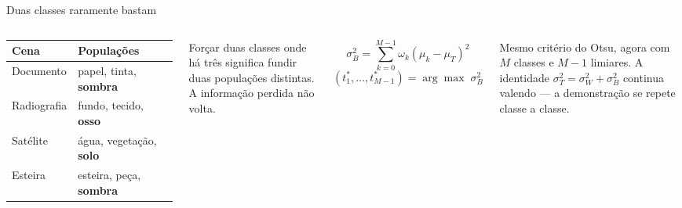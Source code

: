 \documentclass[aspectratio=169,12pt]{beamer}
\newcommand{\sub}[1]{{\small\textcolor{cinza}{#1}}}
\begin{document}
\begin{frame}{Duas classes raramente bastam}

  \begin{columns}[T,onlytextwidth]
      \footnotesize
      \begin{tabular}{@{}ll@{}}
        \toprule
        \textbf{Cena} & \textbf{Populações} \\
        \midrule
        Documento  & papel, tinta, \textbf{sombra} \\
        Radiografia& fundo, tecido, \textbf{osso} \\
        Satélite   & água, vegetação, \textbf{solo} \\
        Esteira    & esteira, peça, \textbf{sombra} \\
        \bottomrule
      \end{tabular}

      \vspace{1em}
      \normalsize
      Forçar duas classes onde há três significa \alert{fundir} duas
      populações distintas. A informação perdida não volta.

      \[
        \sigma_B^2 = \sum_{k=0}^{M-1}\omega_k(\mu_k-\mu_T)^2
      \]
      \[
        (t_1^{*},\dots,t_{M-1}^{*})=\arg\max \;\sigma_B^2
      \]

      \vspace{.5em}
      \sub{Mesmo critério do Otsu, agora com $M$ classes e $M-1$ limiares.
      A identidade $\sigma_T^2=\sigma_W^2+\sigma_B^2$ continua valendo —
      a demonstração se repete classe a classe.}
  \end{columns}

\end{frame}
\end{document}
